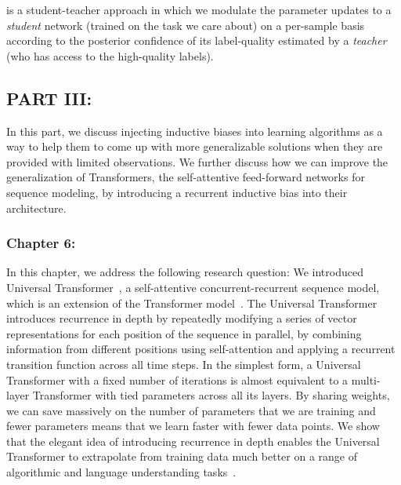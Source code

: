 \fwl is a student-teacher approach in which we modulate the parameter updates to a \emph{student} network (trained on the task we care about) on a per-sample basis according to the posterior confidence of its label-quality estimated by a \emph{teacher} (who has access to the high-quality labels).  

\subsection*{PART III: }
In this part, we discuss injecting inductive biases into learning algorithms as a way to help them to come up with more generalizable solutions when they are provided with limited observations. We further discuss how we can improve the generalization of Transformers, the self-attentive feed-forward networks for sequence modeling, by introducing a recurrent inductive bias into their architecture.

\subsubsection*{Chapter 6: }
In this chapter, we address the following research question:
We introduced Universal Transformer~\citep{Dehghani:ICLR:2019}, a self-attentive concurrent-recurrent sequence model, which is an extension of the Transformer model~\citep{vaswani2017attention}. The Universal Transformer introduces recurrence in depth by repeatedly modifying a series of vector representations for each position of the sequence in parallel, by combining information from different positions using self-attention and applying a recurrent transition function across all time steps. 
In the simplest form, a Universal Transformer with a fixed number of iterations is almost equivalent to a multi-layer Transformer with tied parameters across all its layers. By sharing weights, we can save massively on the number of parameters that we are training and fewer parameters means that we learn faster with fewer data points.  We show that the elegant idea of introducing recurrence in depth enables the Universal Transformer to extrapolate from training data much better on a range of algorithmic and language understanding tasks~\citep{Dehghani:ICLR:2019, Dehghani:2019:WSDM}.


